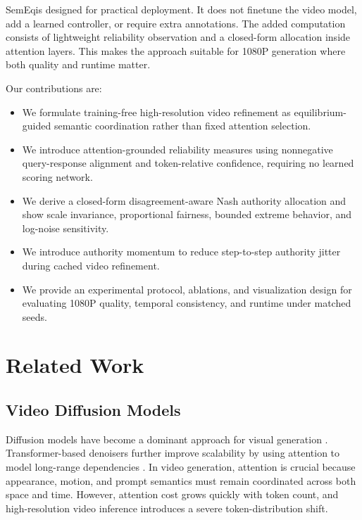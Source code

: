 \documentclass[10pt,twocolumn]{article}
\newcommand{\method}{SemEq}
\begin{document}
\method is designed for practical deployment. It does not finetune the video model, add a learned controller, or require extra annotations. The added computation consists of lightweight reliability observation and a closed-form allocation inside attention layers. This makes the approach suitable for 1080P generation where both quality and runtime matter.

Our contributions are:
\begin{itemize}
    \item We formulate training-free high-resolution video refinement as equilibrium-guided semantic coordination rather than fixed attention selection.
    \item We introduce attention-grounded reliability measures using nonnegative query-response alignment and token-relative confidence, requiring no learned scoring network.
    \item We derive a closed-form disagreement-aware Nash authority allocation and show scale invariance, proportional fairness, bounded extreme behavior, and log-noise sensitivity.
    \item We introduce authority momentum to reduce step-to-step authority jitter during cached video refinement.
    \item We provide an experimental protocol, ablations, and visualization design for evaluating 1080P quality, temporal consistency, and runtime under matched seeds.
\end{itemize}

\section{Related Work}

\subsection{Video Diffusion Models}

Diffusion models have become a dominant approach for visual generation \cite{ho2020ddpm,rombach2022ldm}. Transformer-based denoisers further improve scalability by using attention to model long-range dependencies \cite{vaswani2017attention,peebles2023dit}. In video generation, attention is crucial because appearance, motion, and prompt semantics must remain coordinated across both space and time. However, attention cost grows quickly with token count, and high-resolution video inference introduces a severe token-distribution shift.
\end{document}
